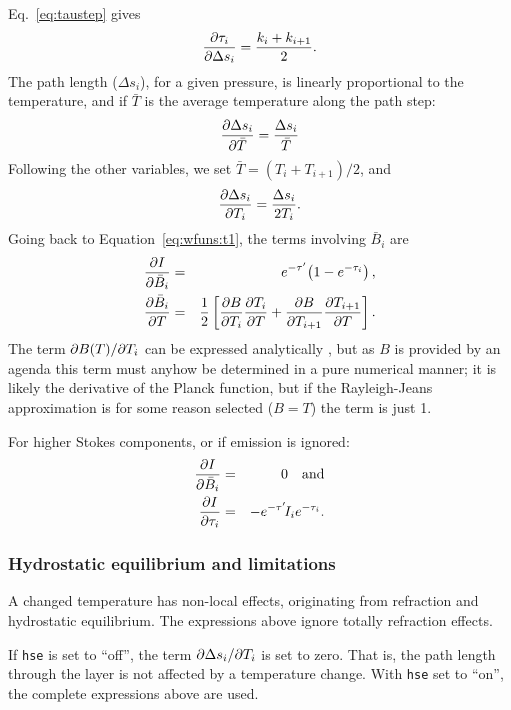 Eq.~\ref{eq:taustep} gives
\begin{equation}
  \frac{\partial \tau_{i}}{\partial \Delta s_i} = \frac{k_i+k_{i+1}}{2}. 
\end{equation}
The path length ($\Delta s_i$), for a given pressure, is linearly proportional
to the temperature, and if $\bar{T}$ is the average temperature along the path
step:
\begin{equation}
  \frac{\partial \Delta s_i}{\partial \bar{T}} =   \frac{\Delta s_i}{\bar{T}} 
\end{equation}
Following the other variables, we set $\bar{T}=(T_i+T_{i+1})/2$, and
\begin{equation}
  \frac{\partial \Delta s_i}{\partial T_i} = \frac{\Delta s_i}{2T_i}.
\end{equation}
Going back to Equation~\ref{eq:wfuns:t1}, the terms involving $\bar{B}_i$ are
\begin{eqnarray}
   \frac{\partial I}{\partial \bar{B}_i} &=&
   e^{-\tau'}\!\left(1-e^{-\tau_{i}}\right), \\
   \frac{\partial \bar{B}_i}{\partial T} &=& \frac{1}{2}\left[
    \frac{\partial B}{\partial T_i} \frac{\partial T_i}{\partial T} +
    \frac{\partial B}{\partial T_{i+1}} \frac{\partial T_{i+1}}{\partial T}
  \right].
\end{eqnarray}
The term $\partial B(T)/\partial T_i$ can be expressed analytically
\citep{eriksson:studi:02}, but as $B$ is provided by an agenda this term must
anyhow be determined in a pure numerical manner; it is likely the derivative of
the Planck function, but if the Rayleigh-Jeans approximation is for some reason
selected ($B=T$) the term is just 1.

For higher Stokes components, or if emission is ignored:
\begin{eqnarray}
   \frac{\partial I}{\partial \bar{B}_i} &=& 0 \quad \mathrm{and} \\
   \frac{\partial I}{\partial \tau_{i}}  &=& -e^{-\tau'}\!I_i e^{-\tau_{i}}.
\end{eqnarray}



\subsubsection{Hydrostatic equilibrium and limitations}
%
A changed temperature has non-local effects, originating from refraction and
hydrostatic equilibrium. The expressions above ignore totally refraction
effects. 

If \verb|hse| is set to ``off'', the term $\partial \Delta s_i/\partial T_i$ is set
to zero. That is, the path length through the layer is not affected by a
temperature change. With \verb|hse| set to ``on'', the complete expressions
above are used. 

